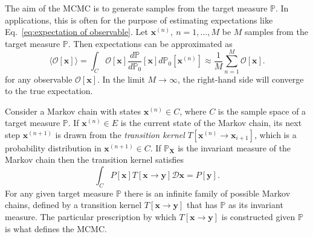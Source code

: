 The aim of the MCMC is to generate samples from the target measure $\mathbb{P}$. In applications, this is often for the purpose of estimating expectations like Eq.~\ref{eq:expectation of observable}. Let $\mathbf{x}^{(n)},\ n=1,\dots,M$ be $M$ samples from the target measure $\mathbb{P}$. Then expectations can be approximated as
\begin{equation} \label{eq:MCMC expectation}
	\langle \mathcal{O}[\mathbf{x}] \rangle = \int_C \mathcal{O}[\mathbf{x}] \frac{d \mathbb{P}}{d \mathbb{P}_0}[\mathbf{x}] d \mathbb{P}_0[\mathbf{x}^{(n)}] \approx \frac{1}{M} \sum_{n=1}^{M} \mathcal{O}[\mathbf{x}].
\end{equation}
for any observable $\mathcal{O}[\mathbf{x}]$. In the limit $M \to \infty$, the right-hand side will converge to the true expectation.

Consider a Markov chain with states $\mathbf{x}^{(n)} \in C$, where $C$ is the sample space of a target measure $\mathbb{P}$. If $\mathbf{x}^{(n)} \in E$ is the current state of the Markov chain, its next step $\mathbf{x}^{(n+1)}$ is drawn from the \textit{transition kernel} $T[\mathbf{x}^{(n)} \to \mathbf{x}_{i+1}]$, which is a probability distribution in $\mathbf{x}^{(n+1)} \in C$. If $\mathbb{P}_\mathbf{X}$ is the invariant measure of the Markov chain then the transition kernel satisfies
\begin{equation} \label{eq:P_X invariant measure T}
	\int_C P[\mathbf{x}] T[\mathbf{x} \to \mathbf{y}] \mathcal{D} \mathbf{x} = P[\mathbf{y}].
\end{equation}
For any given target measure $\mathbb{P}$ there is an infinite family of possible Markov chains, defined by a transition kernel $T[\mathbf{x} \to \mathbf{y}]$ that has $\mathbb{P}$ as its invariant measure. The particular prescription by which $T[\mathbf{x} \to \mathbf{y}]$ is constructed given $\mathbb{P}$ is what defines the MCMC.

